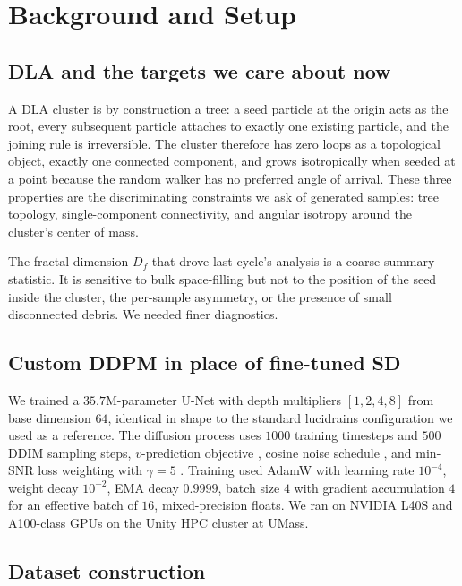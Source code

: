 \documentclass[11pt]{article}
\begin{document}
\section{Background and Setup}

\subsection{DLA and the targets we care about now}

A DLA cluster is by construction a tree: a seed particle at the origin acts as the root, every subsequent particle attaches to exactly one existing particle, and the joining rule is irreversible. The cluster therefore has zero loops as a topological object, exactly one connected component, and grows isotropically when seeded at a point because the random walker has no preferred angle of arrival. These three properties are the discriminating constraints we ask of generated samples: tree topology, single-component connectivity, and angular isotropy around the cluster's center of mass.

The fractal dimension $D_f$ that drove last cycle's analysis is a coarse summary statistic. It is sensitive to bulk space-filling but not to the position of the seed inside the cluster, the per-sample asymmetry, or the presence of small disconnected debris. We needed finer diagnostics.

\subsection{Custom DDPM in place of fine-tuned SD}

We trained a $35.7$M-parameter U-Net \cite{ronneberger2015unet} with depth multipliers $[1, 2, 4, 8]$ from base dimension $64$, identical in shape to the standard lucidrains \cite{lucidrains2024ddpm} configuration we used as a reference. The diffusion process uses $1000$ training timesteps and $500$ DDIM \cite{song2020ddim} sampling steps, $v$-prediction objective \cite{salimans2022progressive}, cosine noise schedule \cite{nichol2021improved}, and min-SNR loss weighting with $\gamma = 5$ \cite{hang2023efficient}. Training used AdamW with learning rate $10^{-4}$, weight decay $10^{-2}$, EMA decay $0.9999$, batch size $4$ with gradient accumulation $4$ for an effective batch of $16$, mixed-precision floats. We ran on NVIDIA L40S and A100-class GPUs on the Unity HPC cluster at UMass.

\subsection{Dataset construction}
\end{document}
